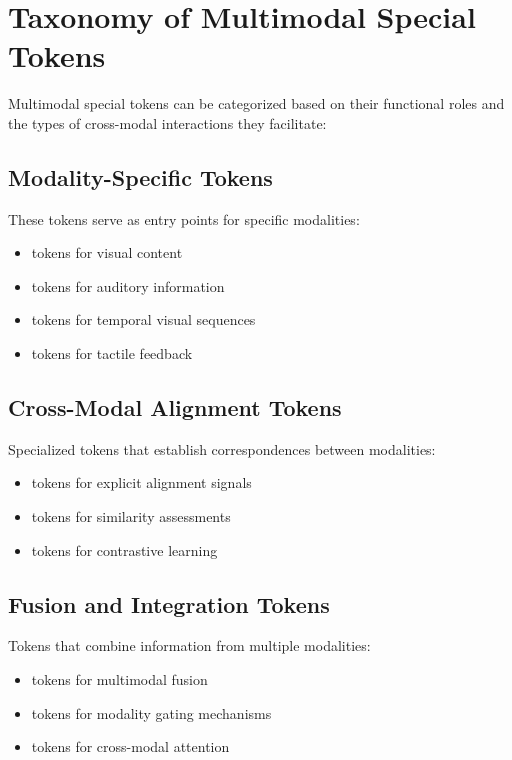 \section{Taxonomy of Multimodal Special Tokens}

Multimodal special tokens can be categorized based on their functional roles and the types of cross-modal interactions they facilitate:

\subsection{Modality-Specific Tokens}
These tokens serve as entry points for specific modalities:
\begin{itemize}
\item \img{} tokens for visual content
\item {} tokens for auditory information
\item {} tokens for temporal visual sequences
\item {} tokens for tactile feedback
\end{itemize}

\subsection{Cross-Modal Alignment Tokens}
Specialized tokens that establish correspondences between modalities:
\begin{itemize}
\item {} tokens for explicit alignment signals
\item {} tokens for similarity assessments
\item {} tokens for contrastive learning
\end{itemize}

\subsection{Fusion and Integration Tokens}
Tokens that combine information from multiple modalities:
\begin{itemize}
\item {} tokens for multimodal fusion
\item {} tokens for modality gating mechanisms
\item {} tokens for cross-modal attention
\end{itemize}

